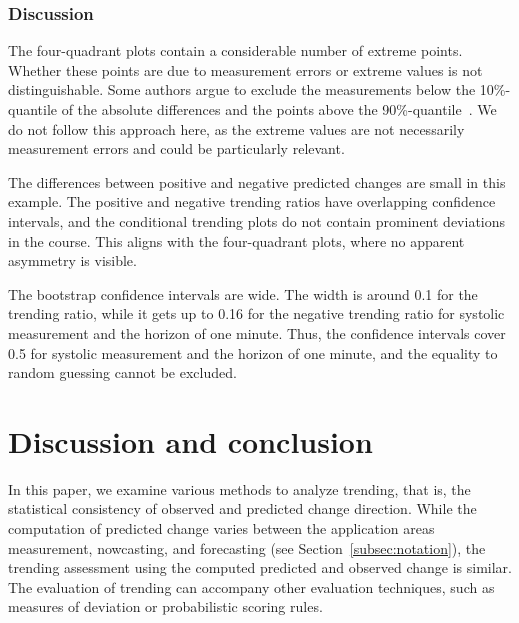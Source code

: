 \documentclass[pdflatex]{sn-jnl}
\theoremstyle{plain}%
\theoremstyle{definition}
\begin{document}
\subsubsection*{Discussion}

The four-quadrant plots contain a considerable number of extreme points.
Whether these points are due to measurement errors or extreme values is not distinguishable.
Some authors argue to exclude the measurements below the 10\%-quantile of the absolute differences and the points above the 90\%-quantile~\citep[see][]{Critchley2010}.
We do not follow this approach here, as the extreme values are not necessarily measurement errors and could be particularly relevant.

The differences between positive and negative predicted changes are small in this example.
The positive and negative trending ratios have overlapping confidence intervals, and the conditional trending plots do not contain prominent deviations in the course.
This aligns with the four-quadrant plots, where no apparent asymmetry is visible.

The bootstrap confidence intervals are wide.
The width is around 0.1 for the trending ratio, while it gets up to 0.16 for the negative trending ratio for systolic measurement and the horizon of one minute.
Thus, the confidence intervals cover 0.5 for systolic measurement and the horizon of one minute, and the equality to random guessing cannot be excluded.



\section{Discussion and conclusion}\label{sec:trending-conclusion}

In this paper, we examine various methods to analyze trending, that is, the statistical consistency of observed and predicted change direction.
While the computation of predicted change varies between the application areas measurement, nowcasting, and forecasting (see Section~\ref{subsec:notation}), the trending assessment using the computed predicted and observed change is similar.
The evaluation of trending can accompany other evaluation techniques, such as measures of deviation or probabilistic scoring rules.
\end{document}
